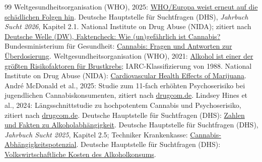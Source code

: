 \documentclass[11pt,a4paper]{article}
\begin{document}
	\newpage
	\begin{thebibliography}{99}
		 Weltgesundheitsorganisation (WHO), 2025: \href{https://www.who.int/europe/de/news/item/24-12-2025-1-in-3-injury-deaths-caused-by-alcohol--who-europe-reiterates-the-harms}{WHO/Europa weist erneut auf die schädlichen Folgen hin}.
		 Deutsche Hauptstelle für Suchtfragen (DHS), \textit{Jahrbuch Sucht 2026}, Kapitel 2.1.
		 National Institute on Drug Abuse (NIDA); zitiert nach \href{https://www.dw.com/de/faktencheck-wie-ungef%C3%A4hrlich-ist-cannabis/a-65853237}{Deutsche Welle (DW), Faktencheck: Wie (un)gefährlich ist Cannabis?}
		 Bundesministerium für Gesundheit: \href{https://www.bundesgesundheitsministerium.de/themen/cannabis/faq-cannabis/ueberdosierung.html}{Cannabis: Fragen und Antworten zur Überdosierung}.
		 Weltgesundheitsorganisation (WHO), 2021: \href{https://www.who.int/europe/de/home/20-10-2021-alcohol-is-one-of-the-biggest-risk-factors-for-breast-cancer}{Alkohol ist einer der größten Risikofaktoren für Brustkrebs}; IARC-Klassifizierung von 1988.
		 National Institute on Drug Abuse (NIDA): \href{https://nida.nih.gov/publications/research-reports/marijuana/cardiovascular-health-effects}{Cardiovascular Health Effects of Marijuana}.
		 André McDonald et al., 2025: Studie zum 11-fach erhöhten Psychoserisiko bei jugendlichen Cannabiskonsumenten, zitiert nach \href{https://www.drugcom.de/news/jugendliche-die-cannabis-konsumieren-haben-ein-erhoehtes-risiko-fuer-psychose/}{drugcom.de}.
		 Lindsey Hines et al., 2024: Längsschnittstudie zu hochpotentem Cannabis und Psychoserisiko, zitiert nach \href{https://www.drugcom.de/news/hochpotenter-cannabis-verdoppelt-risiko-fuer-psychotische-symptome/}{drugcom.de}.
		 Deutsche Hauptstelle für Suchtfragen (DHS): \href{https://www.dhs.de/sucht/zahlen-und-fakten.html}{Zahlen und Fakten zu Alkoholabhängigkeit}.
		 Deutsche Hauptstelle für Suchtfragen (DHS), \textit{Jahrbuch Sucht 2025}, Kapitel 2.5; Techniker Krankenkasse: \href{https://www.tk.de/techniker/gesundheit-und-medizin/erste-hilfe-und-gesundheitsvorsorge/sucht-und-abhaengigkeit/cannabis/cannabis-abhaengigkeitspotenzial-2075314}{Cannabis-Abhängigkeitspotenzial}.
		 Deutsche Hauptstelle für Suchtfragen (DHS): \href{https://www.dhs.de/sucht/zahlen-und-fakten.html}{Volkswirtschaftliche Kosten des Alkoholkonsums}.
	\end{thebibliography}
\end{document}

